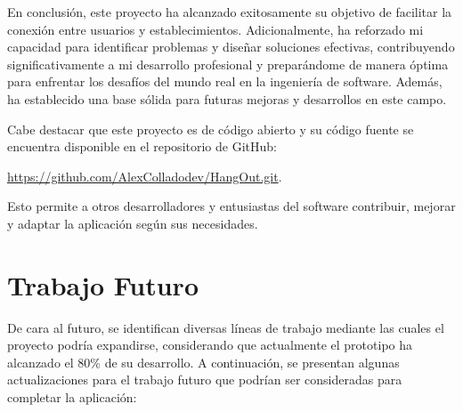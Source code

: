 En conclusión, este proyecto ha alcanzado exitosamente su objetivo de facilitar la conexión entre usuarios y establecimientos. Adicionalmente, ha reforzado mi capacidad para identificar problemas y diseñar soluciones efectivas, contribuyendo significativamente a mi desarrollo profesional y preparándome de manera óptima para enfrentar los desafíos del mundo real en la ingeniería de software. Además, ha establecido una base sólida para futuras mejoras y desarrollos en este campo.

Cabe destacar que este proyecto es de código abierto y su código fuente se encuentra disponible en el repositorio de GitHub:

\url{https://github.com/AlexColladodev/HangOut.git}. 

\noindent Esto permite a otros desarrolladores y entusiastas del software contribuir, mejorar y adaptar la aplicación según sus necesidades.


\section{Trabajo Futuro}

De cara al futuro, se identifican diversas líneas de trabajo mediante las cuales el proyecto podría expandirse, considerando que actualmente el prototipo ha alcanzado el 80\% de su desarrollo. A continuación, se presentan algunas actualizaciones para el trabajo futuro que podrían ser consideradas para completar la aplicación:

